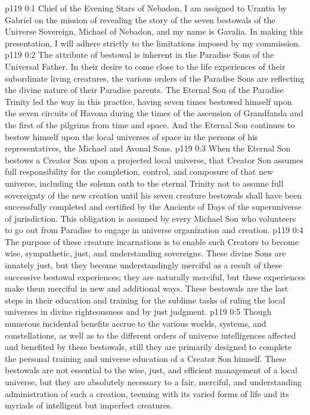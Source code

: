 \author{Gavalia, Chief of Evening Stars}
\vs p119 0:1 Chief of the Evening Stars of Nebadon, I am assigned to Urantia by Gabriel on the mission of revealing the story of the seven bestowals of the Universe Sovereign, Michael of Nebadon, and my name is Gavalia. In making this presentation, I will adhere strictly to the limitations imposed by my commission.
\vs p119 0:2 \pc The attribute of bestowal is inherent in the Paradise Sons of the Universal Father. In their desire to come close to the life experiences of their subordinate living creatures, the various orders of the Paradise Sons are reflecting the divine nature of their Paradise parents. The Eternal Son of the Paradise Trinity led the way in this practice, having seven times bestowed himself upon the seven circuits of Havona during the times of the ascension of Grandfanda and the first of the pilgrims from time and space. And the Eternal Son continues to bestow himself upon the local universes of space in the persons of his representatives, the Michael and Avonal Sons.
\vs p119 0:3 When the Eternal Son bestows a Creator Son upon a projected local universe, that Creator Son assumes full responsibility for the completion, control, and composure of that new universe, including the solemn oath to the eternal Trinity not to assume full sovereignty of the new creation until his seven creature bestowals shall have been successfully completed and certified by the Ancients of Days of the superuniverse of jurisdiction. This obligation is assumed by every Michael Son who volunteers to go out from Paradise to engage in universe organization and creation.
\vs p119 0:4 The purpose of these creature incarnations is to enable such Creators to become wise, sympathetic, just, and understanding sovereigns. These divine Sons are innately just, but they become understandingly merciful as a result of these successive bestowal experiences; they are naturally merciful, but these experiences make them merciful in new and additional ways. These bestowals are the last steps in their education and training for the sublime tasks of ruling the local universes in divine righteousness and by just judgment.
\vs p119 0:5 Though numerous incidental benefits accrue to the various worlds, systems, and constellations, as well as to the different orders of universe intelligences affected and benefited by these bestowals, still they are primarily designed to complete the personal training and universe education of a Creator Son himself. These bestowals are not essential to the wise, just, and efficient management of a local universe, but they are absolutely necessary to a fair, merciful, and understanding administration of such a creation, teeming with its varied forms of life and its myriads of intelligent but imperfect creatures.

